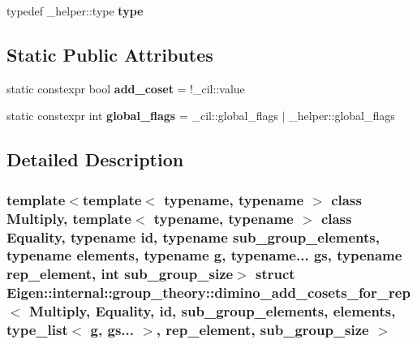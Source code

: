 \begin{DoxyCompactItemize}
\item 
\mbox{\label{struct_eigen_1_1internal_1_1group__theory_1_1dimino__add__cosets__for__rep_3_01_multiply_00_01_e632095b5337826777d5a1f8cb0eea391_aacbd0c209eacd22d83f250546df29512}} 
typedef \+\_\+helper\+::type {\bfseries type}
\end{DoxyCompactItemize}
\subsection*{Static Public Attributes}
\begin{DoxyCompactItemize}
\item 
\mbox{\label{struct_eigen_1_1internal_1_1group__theory_1_1dimino__add__cosets__for__rep_3_01_multiply_00_01_e632095b5337826777d5a1f8cb0eea391_a3994340377243095e389db1defbf4bc4}} 
static constexpr bool {\bfseries add\+\_\+coset} = !\+\_\+cil\+::value
\item 
\mbox{\label{struct_eigen_1_1internal_1_1group__theory_1_1dimino__add__cosets__for__rep_3_01_multiply_00_01_e632095b5337826777d5a1f8cb0eea391_ab0a92bb67e22ad9a2635ee20070ae102}} 
static constexpr int {\bfseries global\+\_\+flags} = \+\_\+cil\+::global\+\_\+flags $\vert$ \+\_\+helper\+::global\+\_\+flags
\end{DoxyCompactItemize}


\subsection{Detailed Description}
\subsubsection*{template$<$template$<$ typename, typename $>$ class Multiply, template$<$ typename, typename $>$ class Equality, typename id, typename sub\+\_\+group\+\_\+elements, typename elements, typename g, typename... gs, typename rep\+\_\+element, int sub\+\_\+group\+\_\+size$>$\newline
struct Eigen\+::internal\+::group\+\_\+theory\+::dimino\+\_\+add\+\_\+cosets\+\_\+for\+\_\+rep$<$ Multiply, Equality, id, sub\+\_\+group\+\_\+elements, elements, type\+\_\+list$<$ g, gs... $>$, rep\+\_\+element, sub\+\_\+group\+\_\+size $>$}



